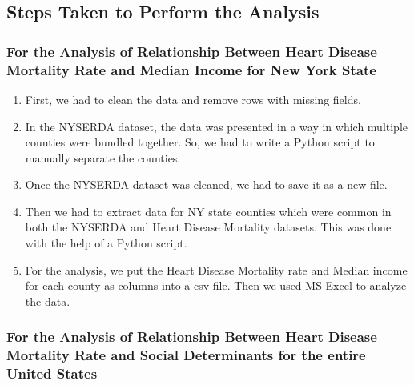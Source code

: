 \documentclass[journal,12pt,onecolumn]{IEEEtran}
\begin{document}
\subsection{Steps Taken to Perform the Analysis}

\subsubsection{For the Analysis of Relationship Between Heart Disease Mortality Rate and Median Income for New York State}
\begin{enumerate}
\item First, we had to clean the data and remove rows with missing fields.
\item In the NYSERDA dataset, the data was presented in a way in which multiple counties were bundled together.
So, we had to write a Python script to manually separate the counties.
\item Once the  NYSERDA dataset was cleaned, we had to save it as a new file.
\item Then we had to extract data for NY state counties which were common in both the NYSERDA and Heart Disease Mortality datasets.
This was done with the help of a Python script.
\item For the analysis, we put the Heart Disease Mortality rate and Median income for each county as columns into a csv file.
Then we used MS Excel to analyze the data.
\end{enumerate}
\subsubsection{For the Analysis of Relationship Between Heart Disease Mortality Rate and Social Determinants for the entire United States}
\end{document}
